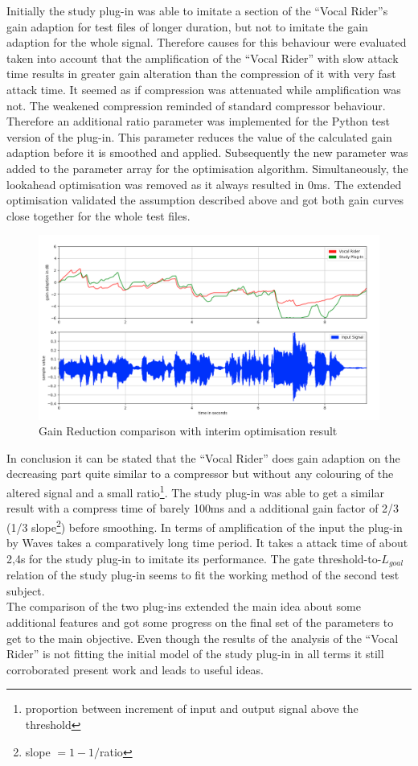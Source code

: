 Initially the study plug-in was able to imitate a section of the “Vocal Rider”s gain adaption for test files of longer duration, but not to imitate the gain adaption for the whole signal. Therefore causes for this behaviour were evaluated taken into account that the amplification of the “Vocal Rider” with slow attack time results in greater gain alteration than the compression of it with very fast attack time. It seemed as if compression was attenuated while amplification was not. The weakened compression reminded of standard compressor behaviour. Therefore an additional ratio parameter was implemented for the Python test version of the plug-in. This parameter reduces the value of the calculated gain adaption before it is smoothed and applied. Subsequently the new parameter was added to the parameter array for the optimisation algorithm. Simultaneously, the lookahead optimisation was removed as it always resulted in 0ms. The extended optimisation validated the assumption described above and got both gain curves close together for the whole test files.\\
\begin{figure}
\includegraphics[width=\textwidth]{images/onlyParts}
\caption{Gain Reduction comparison with interim optimisation result}
\end{figure}
In conclusion it can be stated that the “Vocal Rider” does gain adaption on the decreasing part quite similar to a compressor but without any colouring of the altered signal and a small ratio\footnote{proportion between increment of input and output signal above the threshold}. The study plug-in was able to get a similar result with a compress time of barely 100ms and a additional gain factor of 2/3 (1/3 slope\footnote{slope $= 1 - 1/$ratio}) before smoothing. In terms of amplification of the input the plug-in by Waves takes a comparatively long time period. It takes a attack time of about 2,4s for the study plug-in to imitate its performance. The gate threshold-to-$L_{goal}$ relation of the study plug-in seems to fit the working method of the second test subject.\\
The comparison of the two plug-ins extended the main idea about some additional features and got some progress on the final set of the parameters to get to the main objective. Even though the results of the analysis of the “Vocal Rider” is not fitting the initial model of the study plug-in in all terms it still corroborated present work and leads to useful ideas.\\

